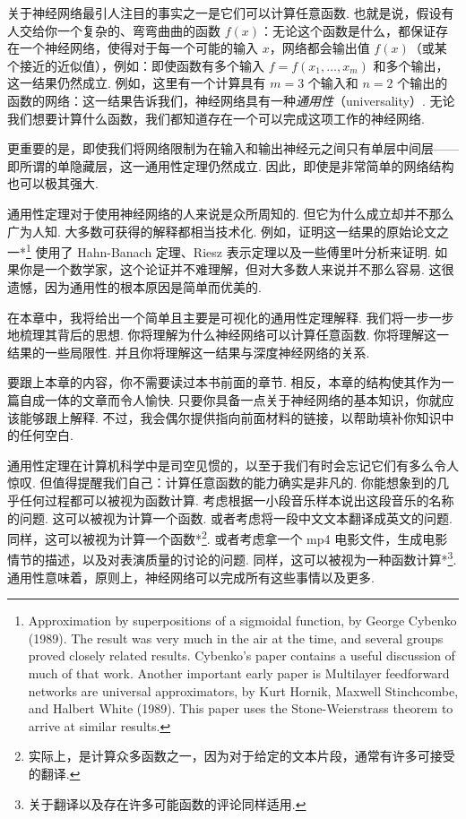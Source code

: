关于神经网络最引人注目的事实之一是它们可以计算任意函数. 也就是说，假设有人交给你一个复杂的、弯弯曲曲的函数 $f(x)$：无论这个函数是什么，都保证存在一个神经网络，使得对于每一个可能的输入 $x$，网络都会输出值 $f(x)$（或某个接近的近似值），例如：即使函数有多个输入 $f = f(x_1, \ldots, x_m)$ 和多个输出，这一结果仍然成立. 例如，这里有一个计算具有 $m = 3$ 个输入和 $n = 2$ 个输出的函数的网络：这一结果告诉我们，神经网络具有一种\emph{通用性}（universality）\label{term:61}. 无论我们想要计算什么函数，我们都知道存在一个可以完成这项工作的神经网络.

更重要的是，即使我们将网络限制为在输入和输出神经元之间只有单层中间层——即所谓的单隐藏层，这一通用性定理仍然成立. 因此，即使是非常简单的网络结构也可以极其强大.

通用性定理对于使用神经网络的人来说是众所周知的. 但它为什么成立却并不那么广为人知. 大多数可获得的解释都相当技术化. 例如，证明这一结果的原始论文之一*\footnote{Approximation by superpositions of a sigmoidal function, by George Cybenko (1989). The result was very much in the air at the time, and several groups proved closely related results. Cybenko's paper contains a useful discussion of much of that work. Another important early paper is Multilayer feedforward networks are universal approximators, by Kurt Hornik, Maxwell Stinchcombe, and Halbert White (1989). This paper uses the Stone-Weierstrass theorem to arrive at similar results.} 使用了 Hahn-Banach 定理、Riesz 表示定理以及一些傅里叶分析来证明. 如果你是一个数学家，这个论证并不难理解，但对大多数人来说并不那么容易. 这很遗憾，因为通用性的根本原因是简单而优美的.

在本章中，我将给出一个简单且主要是可视化的通用性定理解释. 我们将一步一步地梳理其背后的思想. 你将理解为什么神经网络可以计算任意函数. 你将理解这一结果的一些局限性. 并且你将理解这一结果与深度神经网络的关系.

要跟上本章的内容，你不需要读过本书前面的章节. 相反，本章的结构使其作为一篇自成一体的文章而令人愉快. 只要你具备一点关于神经网络的基本知识，你就应该能够跟上解释. 不过，我会偶尔提供指向前面材料的链接，以帮助填补你知识中的任何空白.

通用性定理在计算机科学中是司空见惯的，以至于我们有时会忘记它们有多么令人惊叹. 但值得提醒我们自己：计算任意函数的能力确实是非凡的. 你能想象到的几乎任何过程都可以被视为函数计算. 考虑根据一小段音乐样本说出这段音乐的名称的问题. 这可以被视为计算一个函数. 或者考虑将一段中文文本翻译成英文的问题. 同样，这可以被视为计算一个函数*\footnote{实际上，是计算众多函数之一，因为对于给定的文本片段，通常有许多可接受的翻译.}. 或者考虑拿一个 mp4 电影文件，生成电影情节的描述，以及对表演质量的讨论的问题. 同样，这可以被视为一种函数计算*\footnote{关于翻译以及存在许多可能函数的评论同样适用.}. 通用性意味着，原则上，神经网络可以完成所有这些事情以及更多.

